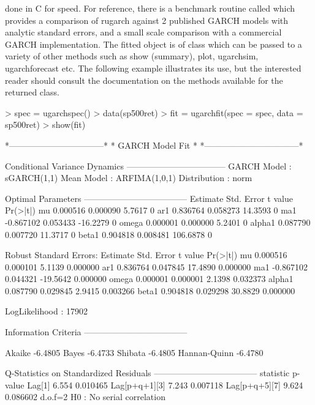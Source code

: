 done in C for speed. For reference, there is a benchmark routine called \verb@ugarchbench@
which provides a comparison of rugarch against 2 published GARCH models with analytic
standard errors, and a small scale comparison with a commercial GARCH implementation.
The fitted object is of class \verb@uGARCHfit@ which can be passed to a variety
of other methods such as show (summary), plot, ugarchsim, ugarchforecast etc.
The following example illustrates its use, but the interested reader should
consult the documentation on the methods available for the returned class.
\begin{Schunk}
\begin{Sinput}
> spec = ugarchspec()
> data(sp500ret)
> fit = ugarchfit(spec = spec, data = sp500ret)
> show(fit)
\end{Sinput}
\begin{Soutput}
*---------------------------------*
*          GARCH Model Fit        *
*---------------------------------*

Conditional Variance Dynamics 	
-----------------------------------
GARCH Model	: sGARCH(1,1)
Mean Model	: ARFIMA(1,0,1)
Distribution	: norm

Optimal Parameters
------------------------------------
        Estimate  Std. Error  t value Pr(>|t|)
mu      0.000516    0.000090   5.7617        0
ar1     0.836764    0.058273  14.3593        0
ma1    -0.867102    0.053433 -16.2279        0
omega   0.000001    0.000000   5.2401        0
alpha1  0.087790    0.007720  11.3717        0
beta1   0.904818    0.008481 106.6878        0

Robust Standard Errors:
        Estimate  Std. Error  t value Pr(>|t|)
mu      0.000516    0.000101   5.1139 0.000000
ar1     0.836764    0.047845  17.4890 0.000000
ma1    -0.867102    0.044321 -19.5642 0.000000
omega   0.000001    0.000001   2.1398 0.032373
alpha1  0.087790    0.029845   2.9415 0.003266
beta1   0.904818    0.029298  30.8829 0.000000

LogLikelihood : 17902

Information Criteria
------------------------------------

Akaike       -6.4805
Bayes        -6.4733
Shibata      -6.4805
Hannan-Quinn -6.4780

Q-Statistics on Standardized Residuals
------------------------------------
              statistic  p-value
Lag[1]            6.554 0.010465
Lag[p+q+1][3]     7.243 0.007118
Lag[p+q+5][7]     9.624 0.086602
d.o.f=2
H0 : No serial correlation


\end{Soutput}
\end{Schunk}
